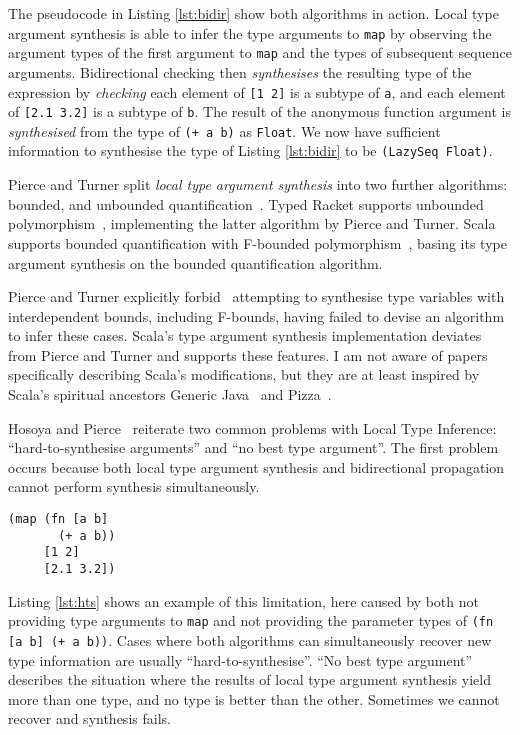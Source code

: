 The pseudocode in Listing \ref{lst:bidir} show both algorithms in action. Local type argument synthesis is able
to infer the type arguments to \lstinline|map| by observing the argument types of the first
argument to \lstinline|map| and the types of subsequent sequence arguments. Bidirectional checking
then \emph{synthesises} the resulting type of the expression by \emph{checking} each element
of \lstinline|[1 2]| is a subtype of \lstinline|a|, and each element of \lstinline|[2.1 3.2]| is a subtype of
\lstinline|b|. The result of the anonymous function argument is \emph{synthesised} from the type of
\lstinline|(+ a b)| as \lstinline|Float|. We now have sufficient information to 
synthesise the type of Listing \ref{lst:bidir} to be \lstinline|(LazySeq Float)|.

Pierce and Turner split \emph{local type argument synthesis} into two further
algorithms: bounded, and unbounded quantification~\cite{PT00}. 
Typed Racket 
supports unbounded polymorphism~\cite{Tob10}, implementing the latter algorithm by Pierce and Turner.
Scala supports bounded quantification with F-bounded polymorphism~\cite{CCHOM89},
basing its type argument synthesis on the bounded quantification algorithm.

Pierce and Turner explicitly forbid~\cite{PT00}
attempting to synthesise type variables with interdependent bounds, including
F-bounds, having failed to devise an algorithm to infer these cases.
Scala's type argument synthesis implementation deviates from Pierce and Turner and supports these features.
I am not aware of papers specifically describing Scala's modifications, but they are at least inspired by
Scala's spiritual ancestors Generic Java~\cite{BOSW98} and Pizza~\cite{OW97}.

Hosoya and Pierce~\cite{HP99} reiterate two common problems with Local Type Inference:
``hard-to-synthesise arguments'' and ``no best type argument''. The first problem occurs because
both local type argument synthesis and bidirectional propagation cannot perform synthesis
simultaneously. 

\begin{lstlisting}[caption=Hard-to-synthesise expression, label=lst:hts]
(map (fn [a b] 
       (+ a b)) 
     [1 2] 
     [2.1 3.2])
\end{lstlisting}

Listing \ref{lst:hts} shows an example of this limitation,
here caused by both not providing type arguments to \lstinline|map| and not providing the parameter types of \lstinline|(fn [a b] (+ a b))|.
 Cases where both algorithms can simultaneously recover new type information are usually ``hard-to-synthesise''.
``No best type argument'' describes the situation where the results of local
type argument synthesis yield more than one type, and no type is better than the other. Sometimes we cannot recover and synthesis
fails.

